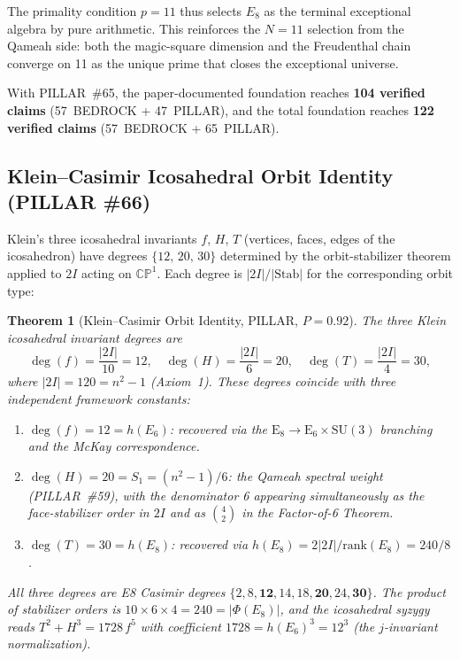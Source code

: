 \documentclass[aps,prd,twocolumn,superscriptaddress,floatfix,nofootinbib]{revtex4-2}
\newtheorem{theorem}{Theorem}
\theoremstyle{definition}
\theoremstyle{remark}
\begin{document}
The primality condition $p = 11$ thus selects $E_8$ as the terminal exceptional
algebra by pure arithmetic.  This reinforces the $N{=}11$ selection from the
Qameah side: both the magic-square dimension and the Freudenthal chain converge
on 11 as the unique prime that closes the exceptional universe.

\noindent
With PILLAR~\#65, the paper-documented foundation reaches
\textbf{104 verified claims} (57~BEDROCK + 47~PILLAR), and the total
foundation reaches \textbf{122 verified claims} (57~BEDROCK + 65~PILLAR).

\subsection{Klein--Casimir Icosahedral Orbit Identity (PILLAR \#66)}
\label{sec:klein-casimir}

Klein's three icosahedral invariants $f$, $H$, $T$ (vertices, faces, edges
of the icosahedron) have degrees $\{12,\,20,\,30\}$ determined by the
orbit-stabilizer theorem applied to $2I$ acting on $\mathbb{CP}^1$.
Each degree is $|2I|/|\mathrm{Stab}|$ for the corresponding orbit type:

\begin{theorem}[Klein--Casimir Orbit Identity, PILLAR, $P{=}0.92$]
\label{thm:klein-casimir}
The three Klein icosahedral invariant degrees are
\[
\deg(f) = \frac{|2I|}{10} = 12, \quad
\deg(H) = \frac{|2I|}{6} = 20, \quad
\deg(T) = \frac{|2I|}{4} = 30,
\]
where $|2I|=120=n^2-1$ (Axiom~1).  These degrees coincide with three
independent framework constants:
\begin{enumerate}
\item $\deg(f) = 12 = h(E_6)$: recovered via the $\mathrm{E}_8\to\mathrm{E}_6\times\mathrm{SU}(3)$ branching
      and the McKay correspondence.
\item $\deg(H) = 20 = S_1 = (n^2-1)/6$: the Qameah spectral weight
      (PILLAR~\#59), with the denominator 6 appearing simultaneously as the
      face-stabilizer order in $2I$ and as $\binom{4}{2}$ in the Factor-of-6
      Theorem.
\item $\deg(T) = 30 = h(E_8)$: recovered via $h(E_8) = 2|2I|/\mathrm{rank}(E_8) = 240/8$.
\end{enumerate}
All three degrees are E8 Casimir degrees
$\{2,8,\mathbf{12},14,18,\mathbf{20},24,\mathbf{30}\}$.
The product of stabilizer orders is
$10\times 6\times 4 = 240 = |\Phi(E_8)|$,
and the icosahedral syzygy reads
$T^2 + H^3 = 1728\,f^5$
with coefficient $1728 = h(E_6)^3 = 12^3$ (the $j$-invariant normalization).
\end{theorem}
\end{document}
